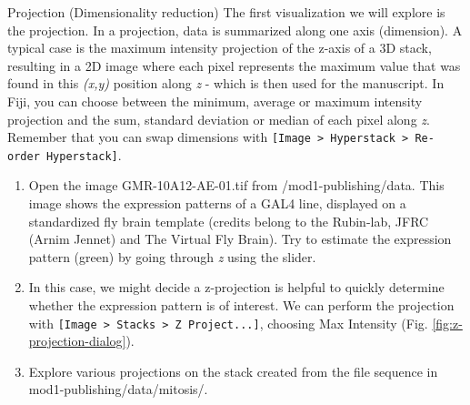\begin{taskbox}{Projection (Dimensionality reduction)}
The first visualization we will explore is the projection. In a projection, data is summarized along one axis (dimension). A typical case is the maximum intensity projection of the z-axis of a 3D stack, resulting in a 2D image where each pixel represents the maximum value that was found in this \emph{(x,y)} position along \emph{z} - which is then used for the manuscript. In Fiji, you can choose between the minimum, average or maximum intensity projection and the sum, standard deviation or median of each pixel along \emph{z}. Remember that you can swap dimensions with \texttt{[Image > Hyperstack > Re-order Hyperstack]}.

\begin{enumerate}
	\item Open the image GMR-10A12-AE-01.tif from /mod1-publishing/data. This image shows the expression patterns of a GAL4 line, displayed on a standardized fly brain template (credits belong to the Rubin-lab, JFRC (Arnim Jennet) and The Virtual Fly Brain). Try to estimate the expression pattern (green) by going through \emph{z} using the slider. 
	\item In this case, we might decide a z-projection is helpful to quickly determine whether the expression pattern is of interest. We can perform the projection with \texttt{[Image > Stacks > Z Project...]}, choosing Max Intensity (Fig. \ref{fig:z-projection-dialog}).
	
	\begin{minipage}[t]{\linewidth}
		\begin{center}
		\medskip
		\label{fig:z-projection-dialog}
		\end{center}
	\end{minipage}
	
	\item Explore various projections on the stack created from the file sequence in mod1-publishing/data/mitosis/.
\end{enumerate}

\end{taskbox}


